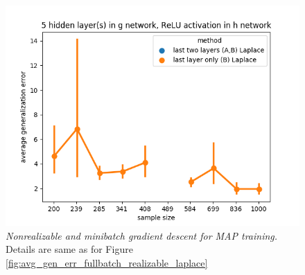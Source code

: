 \documentclass{article} %
\begin{document}
\begin{figure}[t!]
\begin{center}
		\includegraphics[scale=0.35]{laplace_taskid7.png}
	\end{center}
	\caption{\textit{Nonrealizable and minibatch gradient descent for MAP training.} Details are same as for Figure \ref{fig:avg_gen_err_fullbatch_realizable_laplace}
	}
	\label{fig:avg_gen_err_minibatch_nonrealizable_laplace}
\end{figure}
\end{document}
